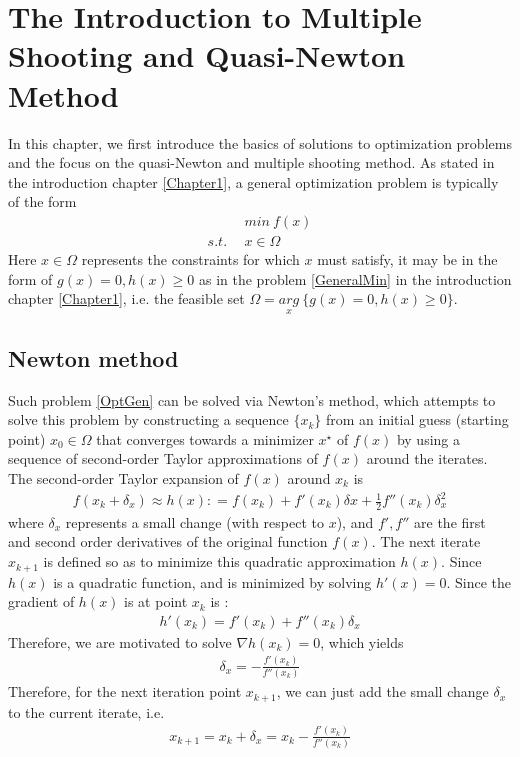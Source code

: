 \chapter{The Introduction to Multiple Shooting and Quasi-Newton Method}
In this chapter, we first introduce the basics of solutions to optimization problems and the focus on the quasi-Newton and multiple shooting method. 
As stated in the introduction chapter \ref{Chapter1}, a general optimization problem is typically of the form 
\begin{equation}
	\begin{aligned}
		\  \  \ & min \  f(x) \\
		s.t.\ \  & x \in \Omega
	\end{aligned}
	\label{OptGen}
\end{equation}
Here $x \in \Omega$ represents the constraints for which $x$ must satisfy, it may be in the form of $ g(x) = 0,  h(x)  \geq  0$ as in the problem \ref{GeneralMin} in the introduction chapter \ref{Chapter1}, i.e. the feasible set $\Omega = \underset{x}{arg} \ \{ g(x) = 0,  h(x)  \geq  0 \}$. 

\section{Newton method}
Such problem \ref{OptGen} can be solved via Newton's method, which attempts to solve this problem by constructing a sequence $\{x_k\}$ from an initial guess (starting point) $x_0 \in \Omega$ that converges towards a minimizer $x^\star$ of $f(x)$  by using a sequence of second-order Taylor approximations of $f(x)$ around the iterates. The second-order Taylor expansion of $f(x)$ around $x_k$ is
\begin{align*}
f(x_k + \delta_x) \approx h(x) : = f(x_k) + f'(x_k)\delta x +\frac{1}{2}f''(x_k)\delta_x^2 
\end{align*}
where $\delta_x$ represents a small change (with respect to $x$), and $f', f''$ are the first and second order derivatives of the original function $f(x)$. The next iterate $x_{k+1}$ is defined so as to minimize this quadratic approximation $h(x)$. Since $h(x)$ is a quadratic function, and is minimized by solving $h'(x) = 0$. Since the gradient of $h(x)$ is at point $x_k$ is :
\begin{align*}
h'(x_k) = f'(x_k) +f''(x_k)\delta_x 
\end{align*}
Therefore, we are motivated to solve $\nabla  h(x_k) =0$, which yields
\begin{align*}
	\delta_x  = - \frac{ f'(x_k)}{f''(x_k)}
\end{align*}
Therefore, for the next iteration point $x_{k+1}$, we can just add the small change $\delta_x$ to the current iterate, i.e. 
\begin{align*}
	x_{k+1}  = x_k + \delta_x = x_k - \frac{ f'(x_k)}{f''(x_k)}
\end{align*}

